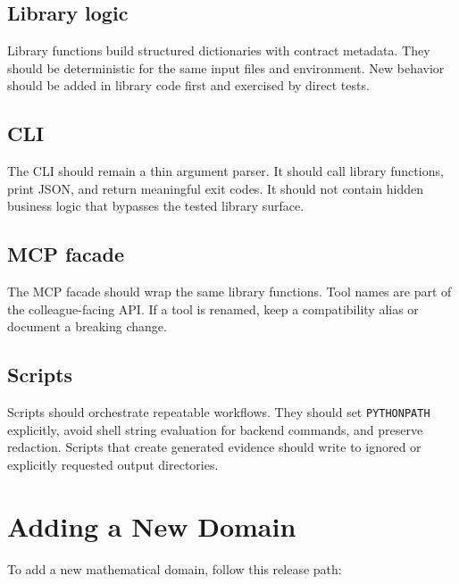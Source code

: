 \documentclass[12pt,a4paper,openany]{book}
\begin{document}
\section{Library logic}

Library functions build structured dictionaries with contract metadata. They
should be deterministic for the same input files and environment. New behavior
should be added in library code first and exercised by direct tests.

\section{CLI}

The CLI should remain a thin argument parser. It should call library functions,
print JSON, and return meaningful exit codes. It should not contain hidden
business logic that bypasses the tested library surface.

\section{MCP facade}

The MCP facade should wrap the same library functions. Tool names are part of
the colleague-facing API. If a tool is renamed, keep a compatibility alias or
document a breaking change.

\section{Scripts}

Scripts should orchestrate repeatable workflows. They should set
\texttt{PYTHONPATH} explicitly, avoid shell string evaluation for backend
commands, and preserve redaction. Scripts that create generated evidence should
write to ignored or explicitly requested output directories.

\chapter{Adding a New Domain}

To add a new mathematical domain, follow this release path:
\end{document}
